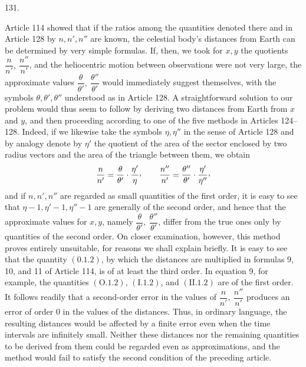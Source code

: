 \par{}\medskip
\begin{center}\hypertarget{native-178-article131}{}131.\end{center}
Article 114 showed that if the ratios among the quantities denoted there and in Article 128 by
$n,n',n''$ are known, the celestial body's distances from Earth can be determined by very simple formulas.
If, then, we took for $x,y$ the quotients $\dfrac{n}{n'},\ \dfrac{n''}{n'}$, and the heliocentric motion between observations were
not very large, the approximate values $\dfrac{\theta}{\theta'},\ \dfrac{\theta''}{\theta'}$ would immediately suggest themselves, with the symbols
$\theta,\theta',\theta''$ understood as in Article 128. A straightforward solution to our problem would thus seem to
follow by deriving two distances from Earth from $x$ and $y$, and then proceeding according to one
of the five methods in Articles 124–128. Indeed, if we likewise take the symbols $\eta,\eta''$ in the sense
of Article 128 and by analogy denote by $\eta'$ the quotient of the area of the sector enclosed by two
radius vectors and the area of the triangle between them, we obtain
\[
\frac{n}{n'}=\frac{\theta}{\theta'}\cdot\frac{\eta'}{\eta}\mathpunct{\raisebox{.45ex}{,}}\qquad
\frac{n''}{n'}=\frac{\theta''}{\theta'}\cdot\frac{\eta'}{\eta''}\mathpunct{\raisebox{.45ex}{,}}
\]
and if $n,n',n''$ are regarded as small quantities of the first order, it is easy to see that $\eta-1,\eta'-1,\eta''-1$ are
generally of the second order, and hence that the approximate values for $x,y$, namely $\dfrac{\theta}{\theta'},\ \dfrac{\theta''}{\theta'}$, differ
from the true ones only by quantities of the second order. On closer examination, however, this
method proves entirely unsuitable, for reasons we shall explain briefly. It is easy to see that the
quantity $(0.1.2)$, by which the distances are multiplied in formulas 9, 10, and 11 of Article 114, is of
at least the third order. In equation 9, for example, the quantities $(\mathrm{O}.1.2)$, $(\mathrm{I}.1.2)$, and $(\mathrm{II}.1.2)$ are of the
first order. It follows readily that a second-order error in the values of $\dfrac{n}{n'},\ \dfrac{n''}{n'}$ produces an error of
order $0$ in the values of the distances. Thus, in ordinary language, the resulting distances would
be affected by a finite error even when the time intervals are infinitely small. Neither these
distances nor the remaining quantities to be derived from them could be regarded even as
approximations, and the method would fail to satisfy the second condition of the preceding article.
